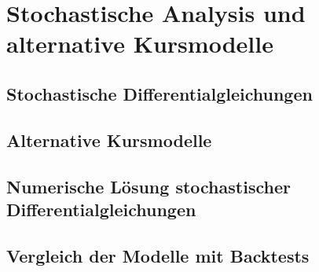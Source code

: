 \section{Stochastische Analysis und alternative Kursmodelle}

\subsection{Stochastische Differentialgleichungen}

\subsection{Alternative Kursmodelle}

\subsection{Numerische Lösung stochastischer Differentialgleichungen}

\subsection{Vergleich der Modelle mit Backtests}